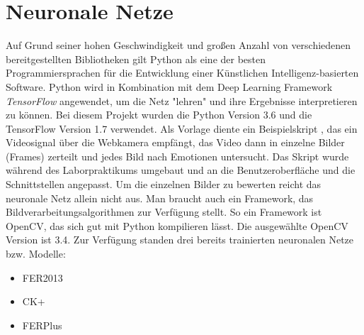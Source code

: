 \documentclass[12pt,a4paper,headinclude,twoside, plainheadsepline, open=right,numbers=noenddot]{scrreprt}
\begin{document}
\section{Neuronale Netze}
Auf Grund seiner hohen Geschwindigkeit und großen Anzahl von verschiedenen
bereitgestellten Bibliotheken gilt Python als eine der besten Programmiersprachen
für die Entwicklung einer Künstlichen Intelligenz-basierten Software.
\newline
Python wird in Kombination mit dem Deep Learning Framework  \textit{TensorFlow} angewendet, um die Netz "{}lehren"{} und ihre Ergebnisse interpretieren zu können.
Bei diesem Projekt wurden die Python Version 3.6 und die TensorFlow Version
1.7 verwendet.
 \newline
Als Vorlage diente ein Beispielskript \cite{LeweOhlsenGit}, das ein Videosignal über die Webkamera
empfängt, das Video dann in einzelne Bilder (Frames) zerteilt und jedes Bild nach Emotionen untersucht. Das Skript wurde während des Laborpraktikums
umgebaut und an die Benutzeroberfläche und die Schnittstellen angepasst.\newline
Um die einzelnen Bilder zu bewerten reicht das neuronale Netz allein nicht aus. Man
braucht auch ein Framework, das Bildverarbeitungsalgorithmen zur Verfügung
stellt. So ein Framework ist OpenCV, das sich gut mit Python kompilieren lässt.
Die ausgewählte OpenCV Version ist 3.4.
 \newline
Zur Verfügung standen drei bereits trainierten neuronalen Netze bzw. Modelle: \newline

\begin{itemize}
\item  FER2013 \cite{IasGoodefellow}
\end{itemize}
\begin{itemize}
\item CK+
\end{itemize}
\begin{itemize}
\item FERPlus \newline
\end{itemize}
\end{document}
